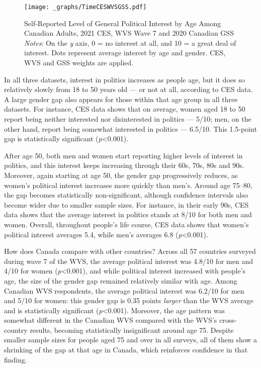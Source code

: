\documentclass[
  letterpaper,
  DIV=11,
  numbers=noendperiod]{scrreprt}
\begin{document}
\begin{figure}

{\centering \texttt{[image: \_graphs/TimeCESWVSGSS.pdf]}

}

\caption{\label{fig-timeceswvsgss}Self-Reported Level of General
Political Interest by Age Among Canadian Adults, 2021 CES, WVS Wave 7
and 2020 Canadian GSS \newline \textit{Notes}: On the \textit{y} axis, 0
= no interest at all, and 10 = a great deal of interest. Dots represent
average interest by age and gender. CES, WVS and GSS weights are
applied.}

\end{figure}

In all three datasets, interest in politics increases as people age, but
it does so relatively slowly from 18 to 50 years old --- or not at all,
according to CES data. A large gender gap also appears for those within
that age group in all three datasets. For instance, CES data shows that
on average, women aged 18 to 50 report being neither interested nor
disinterested in politics --- 5/10; men, on the other hand, report being
somewhat interested in politics --- 6.5/10. This 1.5-point gap is
statistically significant (\emph{p}\textless0.001).

After age 50, both men and women start reporting higher levels of
interest in politics, and this interest keeps increasing through their
60s, 70s, 80s and 90s. Moreover, again starting at age 50, the gender
gap progressively reduces, as women's political interest increases more
quickly than men's. Around age 75--80, the gap becomes statistically
non-significant, although confidence intervals also become wider due to
smaller sample sizes. For instance, in their early 90s, CES data shows
that the average interest in politics stands at 8/10 for both men and
women. Overall, throughout people's life course, CES data shows that
women's political interest averages 5.4, while men's averages 6.8
(\emph{p}\textless0.001).

How does Canada compare with other countries? Across all 57 countries
surveyed during wave 7 of the WVS, the average political interest was
4.8/10 for men and 4/10 for women (\emph{p}\textless0.001), and while
political interest increased with people's age, the size of the gender
gap remained relatively similar with age. Among Canadian WVS
respondents, the average political interest was 6.2/10 for men and 5/10
for women: this gender gap is 0.35 points \emph{larger} than the WVS
average and is statistically significant (\emph{p}\textless0.001).
Moreover, the age pattern was somewhat different in the Canadian WVS
compared with the WVS's cross-country results, becoming statistically
insignificant around age 75. Despite smaller sample sizes for people
aged 75 and over in all surveys, all of them show a shrinking of the gap
at that age in Canada, which reinforces confidence in that finding.
\end{document}
